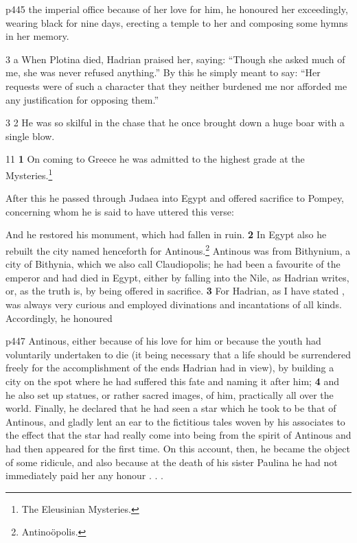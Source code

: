p445 the imperial office because of her love for him, he honoured her exceedingly, wearing black for nine days, erecting a temple to her and composing some hymns in her memory.

3 a When Plotina died, Hadrian praised her, saying: ``Though she asked much of me, she was never refused anything.'' By this he simply meant to say: ``Her requests were of such a character that they neither burdened me nor afforded me any justification for opposing them.''

3 2 He was so skilful in the chase that he once brought down a huge boar with a single blow.

11
\textbf{1} On coming to Greece he was admitted to the highest grade at the Mysteries.\footnote{The Eleusinian Mysteries.

}

After this he passed through Judaea into Egypt and offered sacrifice to Pompey, concerning whom he is said to have uttered this verse:

And he restored his monument, which had fallen in ruin. \textbf{2} In Egypt also he rebuilt the city named henceforth for Antinous.\texthebrew{⁠}\footnote{Antinoöpolis.

} Antinous was from Bithynium, a city of Bithynia, which we also call Claudiopolis; he had been a favourite of the emperor and had died in Egypt, either by falling into the Nile, as Hadrian writes, or, as the truth is, by being offered in sacrifice. \textbf{3} For Hadrian, as I have stated , was always very curious and employed divinations and incantations of all kinds. Accordingly, he honoured

p447 Antinous, either because of his love for him or because the youth had voluntarily undertaken to die (it being necessary that a life should be surrendered freely for the accomplishment of the ends Hadrian had in view), by building a city on the spot where he had suffered this fate and naming it after him; \textbf{4} and he also set up statues, or rather sacred images, of him, practically all over the world. Finally, he declared that he had seen a star which he took to be that of Antinous, and gladly lent an ear to the fictitious tales woven by his associates to the effect that the star had really come into being from the spirit of Antinous and had then appeared for the first time. On this account, then, he became the object of some ridicule, and also because at the death of his sister Paulina he had not immediately paid her any honour . . .

